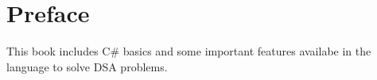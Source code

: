 \chapter*{Preface} 
{}
This book includes C\# basics and some important features availabe in the language to solve DSA problems.